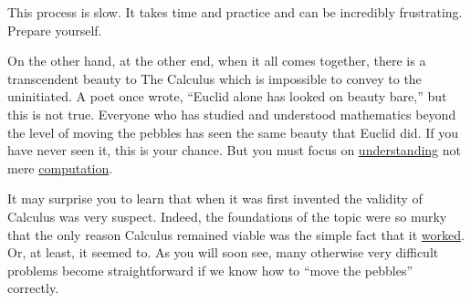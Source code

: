   This process is slow. It takes time and practice and can be
  incredibly frustrating. Prepare yourself.

  On the other hand, at the other end, when it all comes together,
  there is a transcendent beauty to The Calculus which is impossible
  to convey to the uninitiated. A poet once wrote, ``Euclid alone has
  looked on beauty bare,'' but this is not true. Everyone who has
  studied and understood mathematics beyond the level of moving the
  pebbles has seen the same beauty that Euclid did. If you have
  never seen it, this is your chance. But you must focus on
  \underline{understanding} not mere \underline{computation}.



    
  \label{MurkyFoundation}
  It may surprise you to learn that when it was first invented the
  validity of Calculus was very suspect. Indeed, the foundations of
  the topic were so murky that the only reason Calculus remained
  viable was the simple fact that it \underline{worked}. Or, at least,
  it seemed to. As you will soon see, many otherwise very difficult
  problems become straightforward if we know how to ``move the pebbles''
  correctly.





